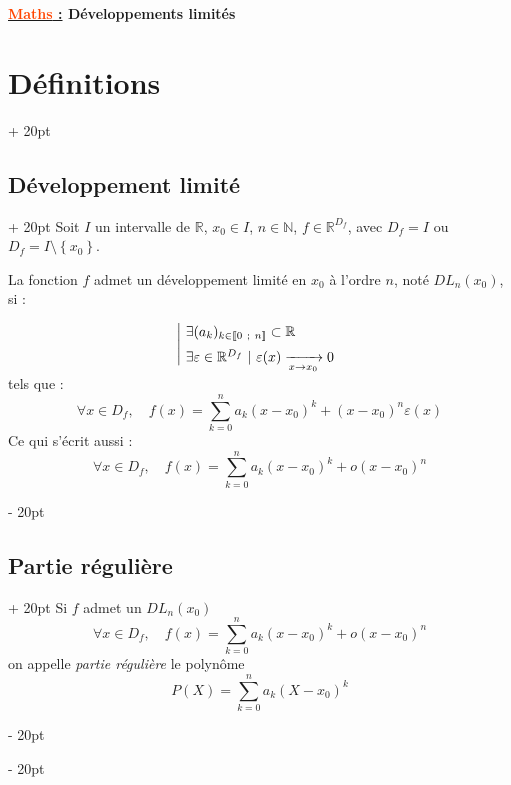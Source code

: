 \documentclass[a4paper, 12pt, twoside]{article}
\renewcommand{\emph}{\textcolor{ff4500}}
\newcommand{\N}{\mathbb{N}} %
\newcommand{\R}{\mathbb{R}} %
\newcommand{\nset}[2]{\left\llbracket #1\ ;\ #2 \right\rrbracket}
\newcommand{\set}[1]{\left\{ #1 \right\}}
\newcommand{\tendsto}[1]{\xrightarrow[#1]{}}
\newcommand{\ind}[1][20pt]{\advance\leftskip + #1}
\newcommand{\deind}[1][20pt]{\advance\leftskip - #1}
\newenvironment{indt}[2][20pt]{#2 \par \ind[#1]}{\par \deind} %
\newcommand{\thetitle}[2]{\begin{center}\textbf{{\LARGE \underline{\emph{#1} :}} {\Large #2}}\end{center}}
\begin{document}
    
    \thetitle{Maths}{Développements limités}
    
    \tableofcontents
    \newpage
    
    
    \begin{indt}{\section{Définitions}}
        
        \begin{indt}{\subsection{Développement limité}}
            Soit $I$ un intervalle de $\R$, $x_0 \in I$, $n \in \N$, $f \in \R^{D_f}$, avec $D_f = I$ ou $D_f = I \setminus \set{x_0}$.
            
            La fonction $f$ admet un développement limité en $x_0$ à l'ordre $n$, noté $DL_n(x_0)$, si :
            
            \[
                \left| \!
                \begin{array}{l}
                    \exists (a_k)_{k \in \nset 0 n} \subset \R
                    \vspace{6pt}
                    \\
                    \exists \varepsilon \in \R^{D_f}\ |\ \varepsilon(x) \tendsto{x \to x_0} 0
                    \vspace{-6pt}
                \end{array}
                \right.
            \]
        tels que :
            \[
                \forall x \in D_f,\quad f(x) = \sum_{k = 0}^n a_k (x - x_0)^k + (x - x_0)^n \varepsilon(x)
            \]
        Ce qui s'écrit aussi :
            \[
                \forall x \in D_f,\quad f(x) = \sum_{k = 0}^n a_k (x - x_0)^k + o(x - x_0)^n
            \]
        \end{indt}
        
        \vspace{12pt}
        
        \begin{indt}{\subsection{Partie régulière}}
            Si $f$ admet un $DL_n(x_0)$
                \[ \forall x \in D_f,\quad f(x) = \sum_{k = 0}^n a_k (x - x_0)^k + o(x - x_0)^n \]
            on appelle \textit{partie régulière} le polynôme
                \[ P(X) = \sum_{k = 0}^n a_k (X - x_0)^k \]
        \end{indt}
        

\end{indt}
\end{document}
